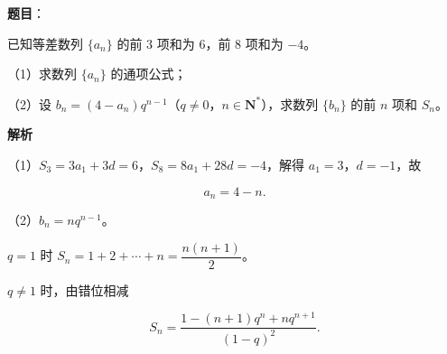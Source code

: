 \begin{answer}

\textbf{题目}：

已知等差数列 $\{a_n\}$ 的前 $3$ 项和为 $6$，前 $8$ 项和为 $-4$。

（1）求数列 $\{a_n\}$ 的通项公式；

（2）设 $b_n=(4-a_n)q^{n-1}$（$q\neq0$，$n\in\mathbf N^*$），求数列 $\{b_n\}$ 的前 $n$ 项和 $S_n$。

\textbf{解析}

（1）$S_3=3a_1+3d=6$，$S_8=8a_1+28d=-4$，解得 $a_1=3$，$d=-1$，故

\nopagebreak[4]
\[a_n=4-n.\]

（2）$b_n=nq^{n-1}$。

$q=1$ 时 $S_n=1+2+\cdots+n=\dfrac{n(n+1)}2$。

$q\neq1$ 时，由错位相减

\nopagebreak[4]
\[S_n=\frac{1-(n+1)q^n+nq^{n+1}}{(1-q)^2}.\]


\end{answer}
